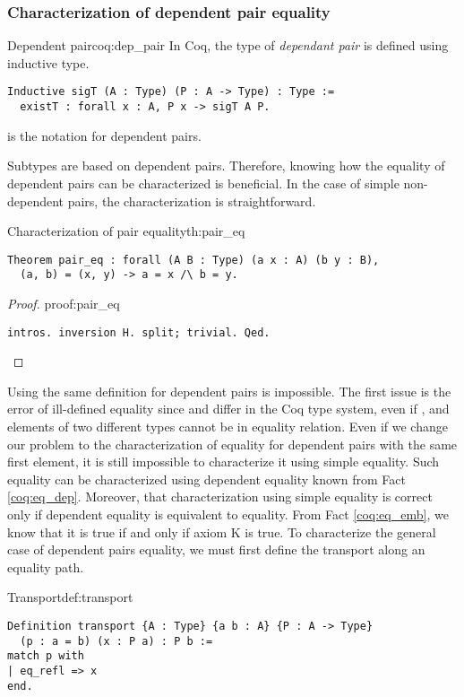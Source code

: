 \subsubsection{Characterization of dependent pair equality}
\begin{coq}{Dependent pair}{coq:dep_pair}
In Coq, the type of \emph{dependant pair} is defined using inductive type.
\begin{verbatim}
Inductive sigT (A : Type) (P : A -> Type) : Type :=
  existT : forall x : A, P x -> sigT A P.
\end{verbatim}
 is the notation for dependent pairs.
\end{coq}
Subtypes are based on dependent pairs. Therefore, knowing how the equality of dependent pairs can be characterized is beneficial. In the case of simple non-dependent pairs, the characterization is straightforward.
\begin{theo}{Characterization of pair equality}{th:pair_eq}
\begin{verbatim}
Theorem pair_eq : forall (A B : Type) (a x : A) (b y : B),
  (a, b) = (x, y) -> a = x /\ b = y.
\end{verbatim}
\end{theo}
\begin{proof}{}{proof:pair_eq}
\begin{verbatim}
intros. inversion H. split; trivial. Qed.
\end{verbatim}
\end{proof}
Using the same definition for dependent pairs is impossible. The first issue is the error of ill-defined equality since  and  differ in the Coq type system, even if , and elements of two different types cannot be in equality relation. Even if we change our problem to the characterization of equality for dependent pairs with the same first element, it is still impossible to characterize it using simple equality. Such equality can be characterized using dependent equality known from Fact \ref{coq:eq_dep}. Moreover, that characterization using simple equality is correct only if dependent equality is equivalent to equality. From Fact \ref{coq:eq_emb}, we know that it is true if and only if axiom K is true. To characterize the general case of dependent pairs equality, we must first define the transport along an equality path.
\begin{defi}{Transport}{def:transport}
\begin{verbatim}
Definition transport {A : Type} {a b : A} {P : A -> Type} 
  (p : a = b) (x : P a) : P b :=
match p with
| eq_refl => x
end.
\end{verbatim}
\end{defi}
